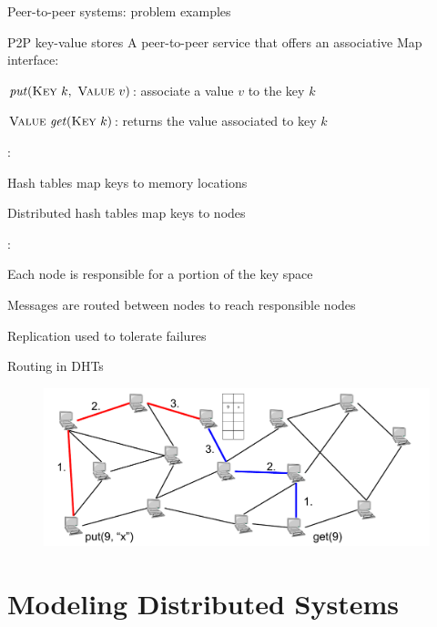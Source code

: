 \begin{frame}{Peer-to-peer systems: problem examples}

\begin{block}{P2P key-value stores}
A peer-to-peer service that offers an associative \alert{Map} interface:
\BI
\item \alert{$\mathit{put}(\textsc{Key}\ k,\ \textsc{Value}\ v)$}: associate a value $v$ to the key $k$
\item \alert{$\textsc{Value}\ \mathit{get}(\textsc{Key}\ k)$}: returns the value associated to key $k$
\EI
\end{block}

\medskip
{}:\\
\BI
\item Hash tables map keys to memory locations
\item Distributed hash tables map keys to nodes
\EI

\medskip
{}:\\
\BI
\item Each node is responsible for a portion of the key space
\item Messages are routed between nodes to reach responsible nodes
\item Replication used to tolerate failures
\EI

\end{frame}

\begin{frame}{Routing in DHTs}

\begin{figure}
	\includegraphics[width=\textwidth]{figs/10/dht-routing}
\end{figure}

\end{frame}


\section{Modeling Distributed Systems}


